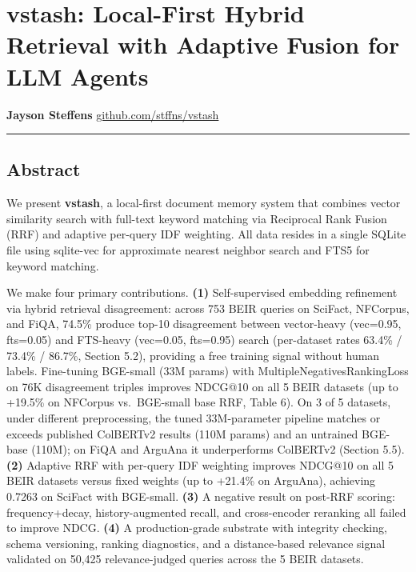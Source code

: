 \documentclass[
  11pt]{article}
\author{Jayson Steffens\\\texttt{github.com/stffns/vstash}}
\date{}
\begin{document}
\section{vstash: Local-First Hybrid Retrieval with Adaptive Fusion for LLM Agents}\label{vstash-local-first-hybrid-retrieval-with-adaptive-fusion-for-llm-agents}

\textbf{Jayson Steffens} \href{https://github.com/stffns/vstash}{github.com/stffns/vstash}

\begin{center}\rule{0.5\linewidth}{0.5pt}\end{center}

\subsection{Abstract}\label{abstract}

We present \textbf{vstash}, a local-first document memory system that combines vector similarity search with full-text keyword matching via Reciprocal Rank Fusion (RRF) and adaptive per-query IDF weighting. All data resides in a single SQLite file using sqlite-vec for approximate nearest neighbor search and FTS5 for keyword matching.

We make four primary contributions. \textbf{(1)} Self-supervised embedding refinement via hybrid retrieval disagreement: across 753 BEIR queries on SciFact, NFCorpus, and FiQA, 74.5\% produce top-10 disagreement between vector-heavy (vec=0.95, fts=0.05) and FTS-heavy (vec=0.05, fts=0.95) search (per-dataset rates 63.4\% / 73.4\% / 86.7\%, Section 5.2), providing a free training signal without human labels. Fine-tuning BGE-small (33M params) with MultipleNegativesRankingLoss on 76K disagreement triples improves NDCG@10 on all 5 BEIR datasets (up to +19.5\% on NFCorpus vs.~BGE-small base RRF, Table 6). On 3 of 5 datasets, under different preprocessing, the tuned 33M-parameter pipeline matches or exceeds published ColBERTv2 results (110M params) and an untrained BGE-base (110M); on FiQA and ArguAna it underperforms ColBERTv2 (Section 5.5). \textbf{(2)} Adaptive RRF with per-query IDF weighting improves NDCG@10 on all 5 BEIR datasets versus fixed weights (up to +21.4\% on ArguAna), achieving 0.7263 on SciFact with BGE-small. \textbf{(3)} A negative result on post-RRF scoring: frequency+decay, history-augmented recall, and cross-encoder reranking all failed to improve NDCG. \textbf{(4)} A production-grade substrate with integrity checking, schema versioning, ranking diagnostics, and a distance-based relevance signal validated on 50,425 relevance-judged queries across the 5 BEIR datasets.
\end{document}

